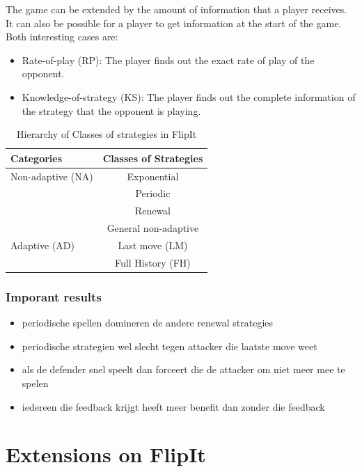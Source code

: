  
The game can be extended by the amount of information that a player receives. It can also be possible for a player to get information at the start of the game. Both interesting cases are:
\begin{itemize}
\item Rate-of-play (RP): The player finds out the exact rate of play of the opponent.
\item Knowledge-of-strategy (KS): The player finds out the complete information of the strategy that the opponent is playing.
\end{itemize}




 

 \begin{table}
 \centering
 \begin{tabular}{ l | c  }
  \textbf{Categories} & \textbf{Classes of Strategies} \\
  \hline Non-adaptive (NA) & Exponential \\
  & Periodic \\
  & Renewal \\
  & General non-adaptive \\
  \hline Adaptive (AD) & Last move (LM) \\
  & Full History (FH) \\  
\end{tabular}
 \caption{Hierarchy of Classes of strategies in FlipIt}
 \label{table:Strategies}
 \end{table}




\subsubsection{Imporant results}

\begin{itemize}
\item periodische spellen domineren de andere renewal strategies
\item periodische strategien wel slecht tegen attacker die laatste move weet
\item als de defender snel speelt dan forceert die de attacker om niet meer mee te spelen
\item iedereen die feedback krijgt heeft meer benefit dan zonder die feedback
\end{itemize}
 
\section{Extensions on FlipIt}

